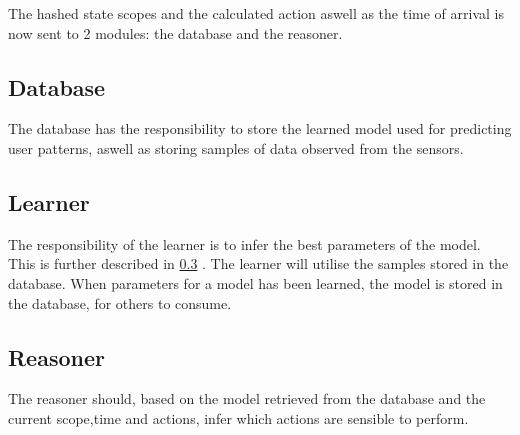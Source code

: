 The hashed state scopes and the calculated action aswell as the time of arrival is now sent to 2 modules: the database and the reasoner.

\subsection{Database}
The database has the responsibility to store the learned model used for predicting user patterns, aswell as storing samples of data observed from the sensors.

\subsection{Learner}
The responsibility of the learner is to infer the best parameters of the model. This is further described in \cref{} . The learner will utilise the samples stored in the database. When parameters for a model has been learned, the model is stored in the database, for others to consume.

\subsection{Reasoner}
The reasoner should, based on the model retrieved from the database and the current scope,time and actions, infer which actions are sensible to perform.